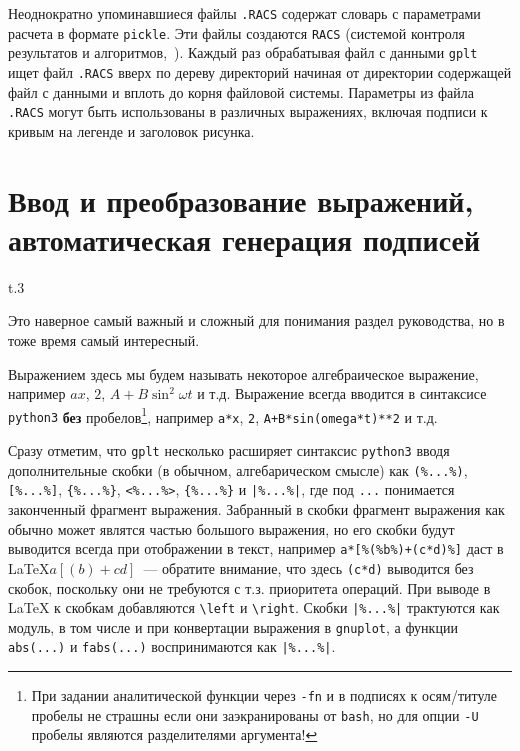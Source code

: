 \documentclass[12pt]{article}
\def\gplt{{\tt gplt}}
\def\gnuplot{{\tt gnuplot}}
\def\python{{\tt python3}}
\begin{document}
Неоднократно упоминавшиеся файлы \verb'.RACS' содержат словарь с параметрами расчета в формате \verb'pickle'. Эти файлы создаются \verb'RACS' (системой контроля результатов и алгоритмов,~\cite{aiwlib:SR:PP2018}). Каждый раз обрабатывая файл с данными \gplt{} ищет файл \verb'.RACS' вверх по дереву директорий начиная от директории содержащей файл с данными
и вплоть до корня файловой системы. Параметры из файла \verb'.RACS' могут быть использованы в различных выражениях, включая подписи к кривым на легенде и
заголовок рисунка. 

\section{Ввод и преобразование выражений, автоматическая генерация подписей}
\begin{wrapfigure}[8]{t}{.3\textwidth}
  \vphantom{.}
  \vspace{-1.7cm}

\end{wrapfigure}
Это наверное самый важный и сложный для понимания раздел руководства, но в тоже время самый интересный. 

Выражением здесь мы будем называть некоторое алгебраическое выражение, например $a x$, $2$, $A + B\sin^2\omega t$ и т.д. Выражение всегда вводится
в синтаксисе \python{} {\bf без} пробелов\footnote{При задании аналитической функции через {\tt -fn} и в подписях к осям/титуле пробелы не страшны если они
  заэкранированы от {\tt bash}, но для опции {\tt -U} пробелы являются разделителями аргумента!}, например \verb'a*x', \verb'2', \verb'A+B*sin(omega*t)**2' и т.д.

Сразу отметим, что \gplt{} несколько расширяет синтаксис \python{} вводя дополнительные скобки (в обычном, алгебарическом смысле) как
\verb'(%...%)', \verb'[%...%]', \verb'{%...%}', \verb'<%...%>', \verb'{%...%}' и \verb'|%...%|', где под \verb'...' понимается законченный фрагмент выражения.
Забранный в скобки фрагмент выражения как обычно может являтся частью большого выражения, но его скобки будут выводится всегда при отображении в текст, например
\verb'a*[%(%b%)+(c*d)%]' даст в \LaTeX\linebreak $a[(b)+cd]$~--- обратите внимание, что здесь \verb'(c*d)' выводится без скобок, поскольку они не требуются
с т.з. приоритета операций. При выводе в \LaTeX{} к скобкам добавляются \verb'\left' и \verb'\right'. Скобки \verb'|%...%|' трактуются как модуль,
в том числе и при конвертации выражения в \gnuplot{}, а функции \verb'abs(...)' и \verb'fabs(...)' воспринимаются как \verb'|%...%|'.
\end{document}
